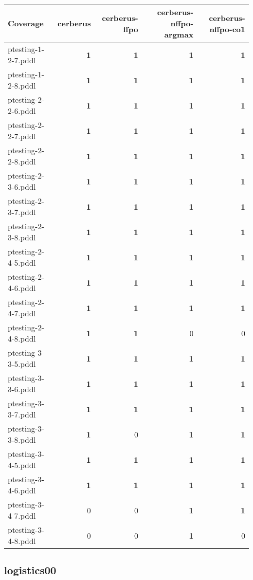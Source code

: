 \documentclass{article}
\begin{document}
\begin{tabular}{@{}lrrrr@{}}
Coverage & cerberus & cerberus-ffpo & cerberus-nffpo-argmax & cerberus-nffpo-co1 \\
\midrule
ptesting-1-2-7.pddl & \textbf{1} & \textbf{1} & \textbf{1} & \textbf{1} \\
ptesting-1-2-8.pddl & \textbf{1} & \textbf{1} & \textbf{1} & \textbf{1} \\
ptesting-2-2-6.pddl & \textbf{1} & \textbf{1} & \textbf{1} & \textbf{1} \\
ptesting-2-2-7.pddl & \textbf{1} & \textbf{1} & \textbf{1} & \textbf{1} \\
ptesting-2-2-8.pddl & \textbf{1} & \textbf{1} & \textbf{1} & \textbf{1} \\
ptesting-2-3-6.pddl & \textbf{1} & \textbf{1} & \textbf{1} & \textbf{1} \\
ptesting-2-3-7.pddl & \textbf{1} & \textbf{1} & \textbf{1} & \textbf{1} \\
ptesting-2-3-8.pddl & \textbf{1} & \textbf{1} & \textbf{1} & \textbf{1} \\
ptesting-2-4-5.pddl & \textbf{1} & \textbf{1} & \textbf{1} & \textbf{1} \\
ptesting-2-4-6.pddl & \textbf{1} & \textbf{1} & \textbf{1} & \textbf{1} \\
ptesting-2-4-7.pddl & \textbf{1} & \textbf{1} & \textbf{1} & \textbf{1} \\
ptesting-2-4-8.pddl & \textbf{1} & \textbf{1} & 0 & 0 \\
ptesting-3-3-5.pddl & \textbf{1} & \textbf{1} & \textbf{1} & \textbf{1} \\
ptesting-3-3-6.pddl & \textbf{1} & \textbf{1} & \textbf{1} & \textbf{1} \\
ptesting-3-3-7.pddl & \textbf{1} & \textbf{1} & \textbf{1} & \textbf{1} \\
ptesting-3-3-8.pddl & \textbf{1} & 0 & \textbf{1} & \textbf{1} \\
ptesting-3-4-5.pddl & \textbf{1} & \textbf{1} & \textbf{1} & \textbf{1} \\
ptesting-3-4-6.pddl & \textbf{1} & \textbf{1} & \textbf{1} & \textbf{1} \\
ptesting-3-4-7.pddl & 0 & 0 & \textbf{1} & \textbf{1} \\
ptesting-3-4-8.pddl & 0 & 0 & \textbf{1} & 0 \\
\end{tabular}

\hypertarget{coverage-logistics00}{}
\subsection*{logistics00}
\end{document}
